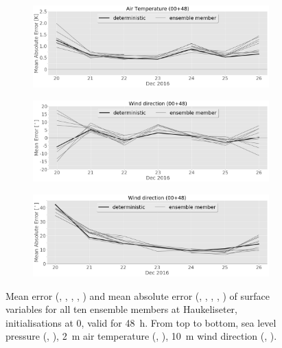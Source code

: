 \begin{figure}[h]
	\begin{subfigure}[b]{0.49\textwidth}
		\includegraphics[width=\textwidth]{./fig_sfc_temp/MAE_20161220_26_00}
		\caption{}\label{fig:MAE:temp}
	\end{subfigure}
	\begin{subfigure}[b]{0.49\textwidth}
		\includegraphics[width=\textwidth]{./fig_sfc_wd/ME_20161220_26_00}
		\caption{}\label{fig:bias:wd}
	\end{subfigure}
	\begin{subfigure}[b]{0.49\textwidth}
		\includegraphics[width=\textwidth]{./fig_sfc_wd/MAE_20161220_26_00}
		\caption{}\label{fig:MAE:wd}
	\end{subfigure}
	\caption{Mean error (\protect{}, \protect{}, \protect{}, \protect{}, \protect{}) and mean absolute error (\protect{}, \protect{}, \protect{}, \protect{}, \protect{}) of surface variables for all ten ensemble members at Haukeliseter, initialisations at \SI{0}{\UTC}, valid for \SI{48}{\hour}. From top to bottom, sea level pressure (\protect{}, \protect{}), \SI{2}{\metre} air temperature (\protect{}, \protect{}), \SI{10}{\metre} wind direction (\protect{}, \protect{}).}\label{fig:bias_MAE}
\end{figure}
